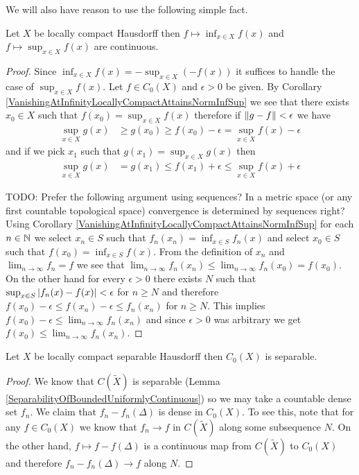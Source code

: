 We will also have reason to use the following simple fact.
\begin{cor}\label{VanishingAtInfinityLocallyCompactSupInfContinuity}Let $X$ be locally compact Hausdorff then $f \mapsto \inf_{x \in X} f(x)$ and $f \mapsto \sup_{x \in X} f(x)$ are 
continuous.
\end{cor}
\begin{proof}
Since $\inf_{x \in X} f(x) = - \sup_{x \in X} (-f(x))$ it suffices to handle the case of $\sup_{x \in X} f(x)$.  Let $f \in C_0(X)$ and $\epsilon > 0$ be given.  By Corollary \ref{VanishingAtInfinityLocallyCompactAttainsNormInfSup} we see that there exists $x_0 \in X$ such that $f(x_0) = \sup_{x \in X} f(x)$ therefore if $\lVert g - f \rVert < \epsilon$
we have 
\begin{align*}
\sup_{x \in X} g(x) &\geq g(x_0) \geq f(x_0) - \epsilon = \sup_{x \in X} f(x) - \epsilon
\end{align*}
and if we pick $x_1$ such that $g(x_1) = \sup_{x \in X} g(x)$ then
\begin{align*}
\sup_{x \in X} g(x) &= g(x_1) \leq f(x_1) + \epsilon \leq \sup_{x \in X} f(x)  + \epsilon
\end{align*}

TODO: Prefer the following argument using sequences?  In a metric space (or any first countable topological space) convergence is determined by sequences right?
Using Corollary \ref{VanishingAtInfinityLocallyCompactAttainsNormInfSup}  for each $n \in \mathbb{N}$ we select
$x_n \in S$ such that $f_n(x_n) = \inf_{x \in S} f_n(x)$ and select $x_0 \in S$ such that $f(x_0) = \inf_{x \in S} f(x)$.  From the definition of $x_n$ and $\lim_{n \to \infty} f_n = f$ we see that $\lim_{n \to \infty} f_n(x_n) \leq \lim_{n \to \infty} f_n(x_0) = f(x_0)$.  On the other hand for every $\epsilon > 0$
there exists $N$ such that $\sup_{x \in S} \left \vert f_n(x) - f(x) \right \vert < \epsilon$ for $n \geq N$ and therefore $f(x_0) - \epsilon \leq f(x_n) - \epsilon \leq f_n(x_n)$ for $n \geq N$.  This implies $f(x_0) - \epsilon \leq \lim_{n \to \infty} f_n(x_n)$ and since $\epsilon >0$ was arbitrary we get $f(x_0) \leq \lim_{n \to \infty} f_n(x_n)$.
\end{proof}

\begin{cor}\label{VanishingAtInfinityLocallyCompactSeparable}Let $X$
  be locally compact separable Hausdorff then $C_0(X)$ is separable.
\end{cor}
\begin{proof}
We know that $C(\tilde{X})$ is separable (Lemma
\ref{SeparabilityOfBoundedUniformlyContinuous}) so we may take a
countable dense set $f_n$.  We claim that $f_n - f_n(\Delta)$ is dense
in $C_0(X)$.  To see this, note that for any $f \in C_0(X)$ we know
that $f_n \to f$ in $C(\tilde{X})$ along some subsequence $N$.  On the
other hand, $f \mapsto f - f(\Delta)$ is a continuous map from
$C(\tilde{X})$ to $C_0(X)$ and therefore $f_n - f_n(\Delta) \to f$
along $N$.
\end{proof}

